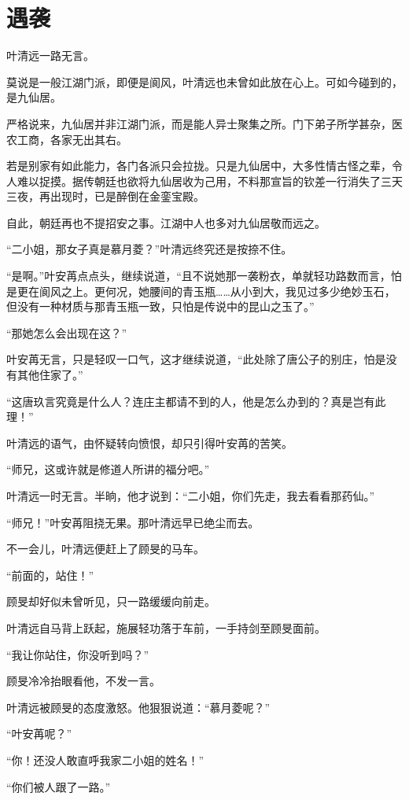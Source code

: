 \chapter{遇袭}

叶清远一路无言。

莫说是一般江湖门派，即便是阆风，叶清远也未曾如此放在心上。可如今碰到的，是九仙居。

严格说来，九仙居并非江湖门派，而是能人异士聚集之所。门下弟子所学甚杂，医农工商，各家无出其右。

若是别家有如此能力，各门各派只会拉拢。只是九仙居中，大多性情古怪之辈，令人难以捉摸。据传朝廷也欲将九仙居收为己用，不料那宣旨的钦差一行消失了三天三夜，再出现时，已是醉倒在金銮宝殿。

自此，朝廷再也不提招安之事。江湖中人也多对九仙居敬而远之。

“二小姐，那女子真是慕月菱？”叶清远终究还是按捺不住。

“是啊。”叶安苒点点头，继续说道，“且不说她那一袭粉衣，单就轻功路数而言，怕是更在阆风之上。更何况，她腰间的青玉瓶……从小到大，我见过多少绝妙玉石，但没有一种材质与那青玉瓶一致，只怕是传说中的昆山之玉了。”

“那她怎么会出现在这？”

叶安苒无言，只是轻叹一口气，这才继续说道，“此处除了唐公子的别庄，怕是没有其他住家了。”

“这唐玖言究竟是什么人？连庄主都请不到的人，他是怎么办到的？真是岂有此理！”

叶清远的语气，由怀疑转向愤恨，却只引得叶安苒的苦笑。

“师兄，这或许就是修道人所讲的福分吧。”

叶清远一时无言。半晌，他才说到：“二小姐，你们先走，我去看看那药仙。”

“师兄！”叶安苒阻挠无果。那叶清远早已绝尘而去。

不一会儿，叶清远便赶上了顾旻的马车。

“前面的，站住！”

顾旻却好似未曾听见，只一路缓缓向前走。

叶清远自马背上跃起，施展轻功落于车前，一手持剑至顾旻面前。

“我让你站住，你没听到吗？”

顾旻冷冷抬眼看他，不发一言。

叶清远被顾旻的态度激怒。他狠狠说道：“慕月菱呢？”

“叶安苒呢？”

“你！还没人敢直呼我家二小姐的姓名！”

“你们被人跟了一路。”

